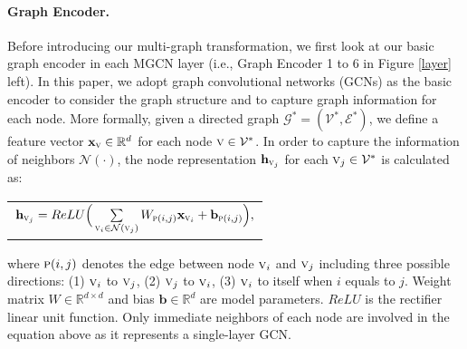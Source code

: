 \documentclass[11pt,a4paper]{article}
\renewcommand{\vec}[1]{\mathbf{#1}} \usepackage{color, colortbl}
\renewcommand{\vec}[1]{\mathbf{#1}}
\begin{document}
\paragraph{Graph Encoder.}
Before introducing our multi-graph transformation, we first look at our basic graph encoder in each MGCN layer (i.e., Graph Encoder 1 to 6 in Figure \ref{layer} left).
In this paper, we adopt graph convolutional networks (GCNs) \cite{duvenaud2015convolutional,kearnes2016molecular,kipf2016semi,marcheggiani2017encoding} as the basic encoder to consider the graph structure and to capture graph information for each node. More formally, given a directed graph $\mathcal{G^*} = \left ( \mathcal{V^*}, \mathcal{E^*}\right )$, we define a feature vector $\vec{x}_\textsc{v} \in \mathbb{R}^d$ for each node $\textsc{v} \in \mathcal{V^*}$. In order to capture the information of neighbors $\mathcal{N} (\cdot)$, the node representation $\vec{h}_{\textsc{v}_j}$ for each ${\textsc{v}_j} \in \mathcal{V}^*$ is calculated as:
\begin{center}
\begin{tabular}{c}
		$
		\vec{h}_{\textsc{v}_j} =
		ReLU \Big (
		\sum\limits_{{\textsc{v}_i} \in \mathcal{N} ({\textsc{v}_j})}
		W_{\textsc{p}(i,j)} \vec{x}_{\textsc{v}_i}
		+
		\vec{b}_{\textsc{p}(i,j)}
		\Big ),
$
	\end{tabular}
\end{center}
where $\textsc{p}(i,j)$ denotes the edge between node $\textsc{v}_i$ and $\textsc{v}_j$ including three possible directions: (1) $\textsc{v}_i$ to $\textsc{v}_j$, (2) $\textsc{v}_j$ to $\textsc{v}_i$, (3) $\textsc{v}_i$ to itself when $i$ equals to $j$. 
Weight matrix $W \in \mathbb{R}^{d \times d}$ and bias $\vec{b} \in \mathbb{R}^d$ are model parameters. $ReLU$ is the rectifier linear unit function. 
Only immediate neighbors of each node are involved in the equation above as it represents a single-layer GCN.
\end{document}

